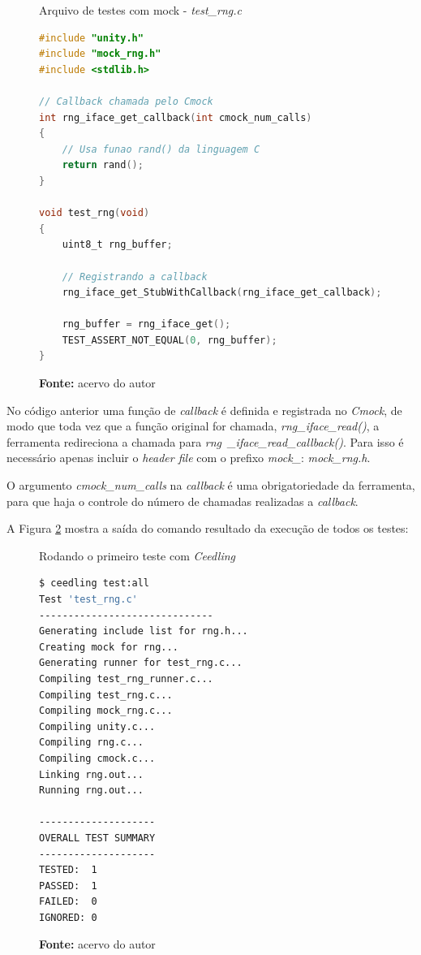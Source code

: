 \documentclass[times, twoside, watermark]{artigo}
\begin{document}
\begin{figure}[H]
  \centering
  \caption{Arquivo de testes com mock - \textit{test\_rng.c}}
\begin{lstlisting}[language=C]
#include "unity.h"
#include "mock_rng.h"
#include <stdlib.h>

// Callback chamada pelo Cmock
int rng_iface_get_callback(int cmock_num_calls)
{
	// Usa funao rand() da linguagem C
	return rand();
}

void test_rng(void)
{
	uint8_t rng_buffer;

	// Registrando a callback
	rng_iface_get_StubWithCallback(rng_iface_get_callback);
       
	rng_buffer = rng_iface_get();
	TEST_ASSERT_NOT_EQUAL(0, rng_buffer);
}
\end{lstlisting}
  \label{fig:mock-test}
  \caption*{\newline\textbf{Fonte:} acervo do autor}
\end{figure}

No código anterior uma função de \textit{callback} é definida e registrada no
\textit{Cmock}, de modo que toda vez que a função original for chamada,
\textit{rng\_iface\_read()}, a ferramenta redireciona a chamada para
\textit{rng~\_iface\_read\_callback()}. Para isso é necessário apenas incluir
o \textit{header file} com o prefixo \textit{mock\_}: \textit{mock\_rng.h}.

O argumento \textit{cmock\_num\_calls} na \textit{callback} é uma obrigatoriedade
da ferramenta, para que haja o controle do número de chamadas realizadas a
\textit{callback}.

A Figura \ref{fig:ceedling-output} mostra a saída do comando resultado da execução
de todos os testes:\hfill\\

\begin{figure}[H]
  \centering
  \caption{Rodando o primeiro teste com \textit{Ceedling}}
\begin{lstlisting}[language=bash]
$ ceedling test:all
Test 'test_rng.c'
------------------------------
Generating include list for rng.h...
Creating mock for rng...
Generating runner for test_rng.c...
Compiling test_rng_runner.c...
Compiling test_rng.c...
Compiling mock_rng.c...
Compiling unity.c...
Compiling rng.c...
Compiling cmock.c...
Linking rng.out...
Running rng.out...

--------------------
OVERALL TEST SUMMARY
--------------------
TESTED:  1
PASSED:  1
FAILED:  0
IGNORED: 0
\end{lstlisting}
  \label{fig:ceedling-output}
  \caption*{\newline\textbf{Fonte:} acervo do autor}
\end{figure}
\end{document}
